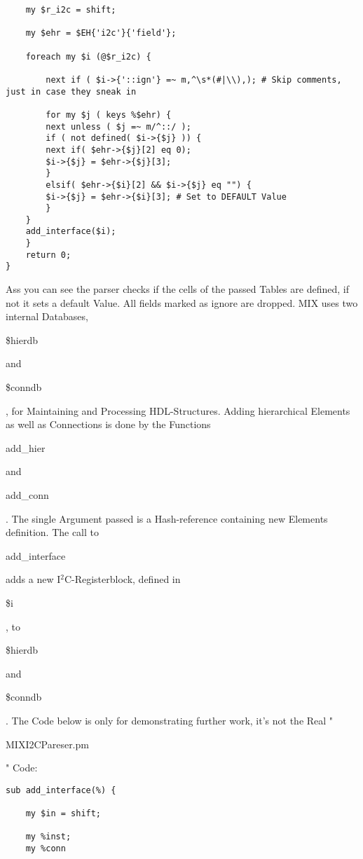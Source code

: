 \documentclass[a4paper,12pt]{article}
\begin{document}
\begin{tt}
\begin{verbatim}
    my $r_i2c = shift;

    my $ehr = $EH{'i2c'}{'field'};

    foreach my $i (@$r_i2c) {

        next if ( $i->{'::ign'} =~ m,^\s*(#|\\),); # Skip comments, just in case they sneak in

        for my $j ( keys %$ehr) {
	    next unless ( $j =~ m/^::/ );
	    if ( not defined( $i->{$j} )) {
		next if( $ehr->{$j}[2] eq 0);
		$i->{$j} = $ehr->{$j}[3];
	    }
	    elsif( $ehr->{$i}[2] && $i->{$j} eq "") {
		$i->{$j} = $ehr->{$i}[3]; # Set to DEFAULT Value
	    }
	}
	add_interface($i);
    }
    return 0;
}
\end{verbatim}
Ass you can see the parser checks if the cells of the passed Tables are defined, if not it sets a default Value. All fields marked as ignore are dropped.\newline
MIX uses two internal Databases, \begin{tt}\$hierdb\end{tt} and \begin{tt}\$conndb\end{tt}, for Maintaining and Processing HDL-Structures. Adding hierarchical Elements as well as Connections is done by the Functions \begin{tt}add_hier\end{tt} and \begin{tt}add_conn\end{tt}. The single Argument passed is a Hash-reference containing new Elements definition. The call to \begin{tt}add_interface\end{tt} adds a new I$^2$C-Registerblock, defined in \begin{tt}\$i\end{tt}, to \begin{tt}\$hierdb\end{tt} and \begin{tt}\$conndb\end{tt}. The Code below is only for demonstrating further work, it's not the Real "\begin{tt}MIXI2CPareser.pm\end{tt}" Code:\newline
\begin{verbatim}
sub add_interface(%) {

    my $in = shift;

    my %inst;
    my %conn


\end{verbatim}
\end{tt}
\end{document}

